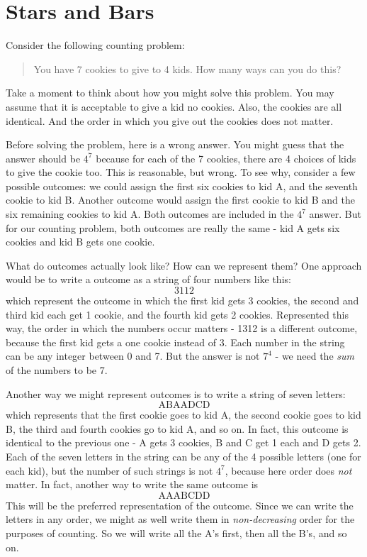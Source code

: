 \documentclass[12pt]{article}
\begin{document}
\section{Stars and Bars}

Consider the following counting problem:

\begin{quote}
  You have 7 cookies to give to 4 kids.  How many ways can you do this?
\end{quote}

Take a moment to think about how you might solve this problem.  You may assume that it is acceptable to give a kid no cookies.  Also, the cookies are all identical.  And the order in which you give out the cookies does not matter.

Before solving the problem, here is a wrong answer.  You might guess that the answer should be $4^7$ because for each of the 7 cookies, there are 4 choices of kids to give the cookie too. This is reasonable, but wrong.  To see why, consider a few possible outcomes:  we could assign the first six cookies to kid A, and the seventh cookie to kid B.  Another outcome would assign the first cookie to kid B and the six remaining cookies to kid A.  Both outcomes are included in the $4^7$ answer.  But for our counting problem, both outcomes are really the same - kid A gets six cookies and kid B gets one cookie.

What do outcomes actually look like?  How can we represent them? One approach would be to write a outcome as a string of four numbers like this:
\[3112\]
which represent the outcome in which the first kid gets 3 cookies, the second and third kid each get 1 cookie, and the fourth kid gets 2 cookies.  Represented this way, the order in which the numbers occur matters - 1312 is a different outcome, because the first kid gets a one cookie instead of 3.  Each number in the string can be any integer between 0 and 7.  But the answer is not $7^4$ - we need the {\em sum} of the numbers to be 7.  

Another way we might represent outcomes is to write a string of seven letters:
\[\mbox{ABAADCD}\]
which represents that the first cookie goes to kid A, the second cookie goes to kid B, the third and fourth cookies go to kid A, and so on.  In fact, this outcome is identical to the previous one - A gets 3 cookies, B and C get 1 each and D gets 2.  Each of the seven letters in the string can be any of the 4 possible letters (one for each kid), but the number of such strings is not $4^7$, because here order does {\em not} matter.  In fact, another way to write the same outcome is
\[\mbox{AAABCDD}\]
This will be the preferred representation of the outcome.  Since we can write the letters in any order, we might as well write them in {\em non-decreasing} order for the purposes of counting.  So we will write all the A's first, then all the B's, and so on.  
\end{document}
